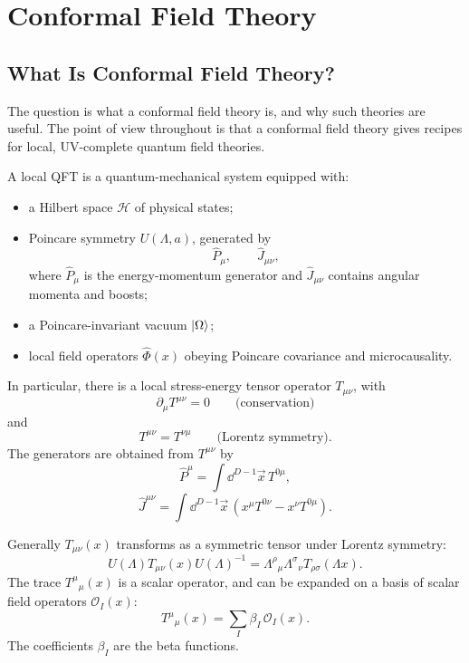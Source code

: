 \chapter{Conformal Field Theory}

\section{What Is Conformal Field Theory?}

The question is what a conformal field theory is, and why such theories
are useful.  The point of view throughout is that a conformal field
theory gives recipes for local, UV-complete quantum field theories.

A local QFT is a quantum-mechanical system equipped with:
\begin{itemize}
  \item a Hilbert space \(\mathcal H\) of physical states;
  \item Poincare symmetry \(U(\Lambda,a)\), generated by
  \[
    \widehat P_\mu,\qquad \widehat J_{\mu\nu},
  \]
  where \(\widehat P_\mu\) is the energy-momentum generator and
  \(\widehat J_{\mu\nu}\) contains angular momenta and boosts;
  \item a Poincare-invariant vacuum \(\ket{\Omega}\);
  \item local field operators \(\widehat\Phi(x)\) obeying Poincare
  covariance and microcausality.
\end{itemize}
In particular, there is a local stress-energy tensor operator
\(T_{\mu\nu}\), with
\[
  \partial_\mu T^{\mu\nu}=0
  \qquad\text{(conservation)}
\]
and
\[
  T^{\mu\nu}=T^{\nu\mu}
  \qquad\text{(Lorentz symmetry)}.
\]
The generators are obtained from \(T^{\mu\nu}\) by
\[
  \widehat P^\mu=\int \dd^{D-1}\vec x\,T^{0\mu},
\]
\[
  \widehat J^{\mu\nu}
  =
  \int \dd^{D-1}\vec x\,
  \left(x^\mu T^{0\nu}-x^\nu T^{0\mu}\right).
\]

Generally \(T_{\mu\nu}(x)\) transforms as a symmetric tensor under
Lorentz symmetry:
\[
  U(\Lambda)T_{\mu\nu}(x)U(\Lambda)^{-1}
  =
  \Lambda^\rho{}_\mu\Lambda^\sigma{}_\nu
  T_{\rho\sigma}(\Lambda x).
\]
The trace \(T^\mu{}_\mu(x)\) is a scalar operator, and can be expanded
on a basis of scalar field operators \(\mathcal O_I(x)\):
\[
  T^\mu{}_\mu(x)=\sum_I \beta_I\,\mathcal O_I(x).
\]
The coefficients \(\beta_I\) are the beta functions.

